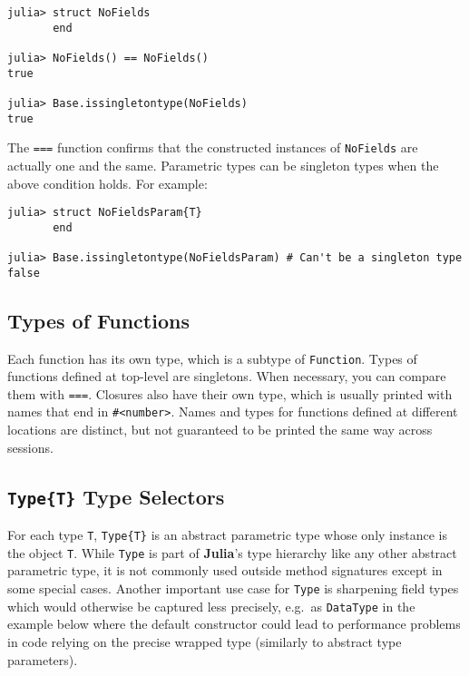 \documentclass[
]{article}
\begin{document}
\begin{verbatim}
julia> struct NoFields
       end

julia> NoFields() == NoFields()
true

julia> Base.issingletontype(NoFields)
true
\end{verbatim}

The \texttt{===} function confirms that the constructed instances of
\texttt{NoFields} are actually one and the same. Parametric types can be
singleton types when the above condition holds. For example:

\begin{verbatim}
julia> struct NoFieldsParam{T}
       end

julia> Base.issingletontype(NoFieldsParam) # Can't be a singleton type
false
\end{verbatim}

\hypertarget{types-of-functions}{%
\subsection{Types of Functions}\label{types-of-functions}}

Each function has its own type, which is a subtype of \texttt{Function}.
Types of functions defined at top-level are singletons. When necessary,
you can compare them with \texttt{===}. Closures also have their own
type, which is usually printed with names that end in
\texttt{\#\textless{}number\textgreater{}}. Names and types for
functions defined at different locations are distinct, but not
guaranteed to be printed the same way across sessions.

\hypertarget{typet-type-selectors}{%
\subsection{\texorpdfstring{\texttt{Type\{T\}} Type
Selectors}{Type\{T\} Type Selectors}}\label{typet-type-selectors}}

For each type \texttt{T}, \texttt{Type\{T\}} is an abstract parametric
type whose only instance is the object \texttt{T}. While \texttt{Type}
is part of \textbf{Julia}'s type hierarchy like any other abstract
parametric type, it is not commonly used outside method signatures
except in some special cases. Another important use case for
\texttt{Type} is sharpening field types which would otherwise be
captured less precisely, e.g.~as \texttt{DataType} in the example below
where the default constructor could lead to performance problems in code
relying on the precise wrapped type (similarly to abstract type
parameters).
\end{document}
